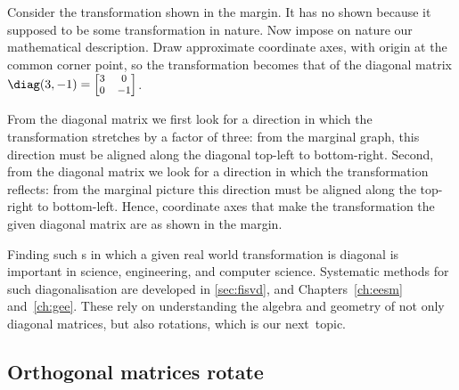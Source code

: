 \begin{example} \label{eg:}
Consider the transformation shown in the margin.
%
It has no  shown because it supposed to be some transformation in nature. 
Now impose on nature our mathematical description.
Draw approximate coordinate axes, with origin at the common corner point, so the transformation becomes that of the diagonal matrix \(\diag(3,-1)=\footnotesize\begin{bmatrix} 3&0\\0&-1 \end{bmatrix}\).

\begin{solution} 
From the diagonal matrix we first look for a direction in which the transformation stretches by a factor of three: 
%
from the marginal graph, this direction must be aligned along the diagonal top-left to bottom-right.
Second, from the diagonal matrix we look for a direction in which the transformation reflects: from the marginal picture this direction must be aligned along the top-right to bottom-left.
Hence, coordinate axes that make the transformation the given diagonal matrix are as shown in the margin. 
\end{solution}
\end{example}


Finding such s in which a given real world transformation is diagonal is important in science, engineering, and computer science.
Systematic methods for such diagonalisation are developed in \autoref{sec:fisvd}, and Chapters~\ref{ch:eesm} and~\ref{ch:gee}.
These rely on understanding the algebra and geometry of not only diagonal matrices, but also rotations, which is our next~topic.













\subsection{Orthogonal matrices rotate}
\label{sec:omr}

